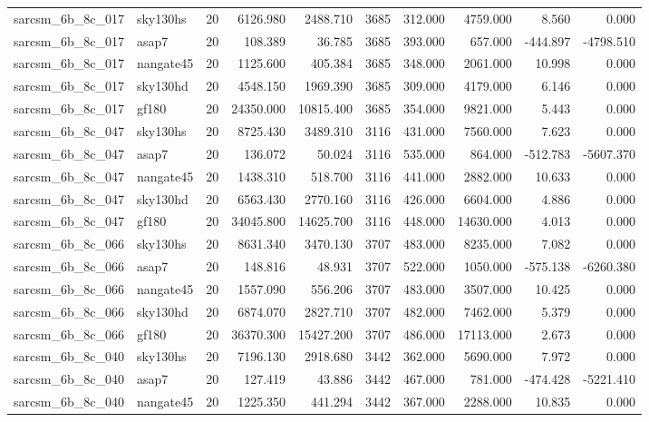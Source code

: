 \documentclass{article}
\begin{document}
\begin{longtable}{llrrrrrrrr}
sarcsm\_6b\_8c\_017 & sky130hs & 20 & 6126.980 & 2488.710 & 3685 & 312.000 & 4759.000 & 8.560 & 0.000 \\
sarcsm\_6b\_8c\_017 & asap7 & 20 & 108.389 & 36.785 & 3685 & 393.000 & 657.000 & -444.897 & -4798.510 \\
sarcsm\_6b\_8c\_017 & nangate45 & 20 & 1125.600 & 405.384 & 3685 & 348.000 & 2061.000 & 10.998 & 0.000 \\
sarcsm\_6b\_8c\_017 & sky130hd & 20 & 4548.150 & 1969.390 & 3685 & 309.000 & 4179.000 & 6.146 & 0.000 \\
sarcsm\_6b\_8c\_017 & gf180 & 20 & 24350.000 & 10815.400 & 3685 & 354.000 & 9821.000 & 5.443 & 0.000 \\
sarcsm\_6b\_8c\_047 & sky130hs & 20 & 8725.430 & 3489.310 & 3116 & 431.000 & 7560.000 & 7.623 & 0.000 \\
sarcsm\_6b\_8c\_047 & asap7 & 20 & 136.072 & 50.024 & 3116 & 535.000 & 864.000 & -512.783 & -5607.370 \\
sarcsm\_6b\_8c\_047 & nangate45 & 20 & 1438.310 & 518.700 & 3116 & 441.000 & 2882.000 & 10.633 & 0.000 \\
sarcsm\_6b\_8c\_047 & sky130hd & 20 & 6563.430 & 2770.160 & 3116 & 426.000 & 6604.000 & 4.886 & 0.000 \\
sarcsm\_6b\_8c\_047 & gf180 & 20 & 34045.800 & 14625.700 & 3116 & 448.000 & 14630.000 & 4.013 & 0.000 \\
sarcsm\_6b\_8c\_066 & sky130hs & 20 & 8631.340 & 3470.130 & 3707 & 483.000 & 8235.000 & 7.082 & 0.000 \\
sarcsm\_6b\_8c\_066 & asap7 & 20 & 148.816 & 48.931 & 3707 & 522.000 & 1050.000 & -575.138 & -6260.380 \\
sarcsm\_6b\_8c\_066 & nangate45 & 20 & 1557.090 & 556.206 & 3707 & 483.000 & 3507.000 & 10.425 & 0.000 \\
sarcsm\_6b\_8c\_066 & sky130hd & 20 & 6874.070 & 2827.710 & 3707 & 482.000 & 7462.000 & 5.379 & 0.000 \\
sarcsm\_6b\_8c\_066 & gf180 & 20 & 36370.300 & 15427.200 & 3707 & 486.000 & 17113.000 & 2.673 & 0.000 \\
sarcsm\_6b\_8c\_040 & sky130hs & 20 & 7196.130 & 2918.680 & 3442 & 362.000 & 5690.000 & 7.972 & 0.000 \\
sarcsm\_6b\_8c\_040 & asap7 & 20 & 127.419 & 43.886 & 3442 & 467.000 & 781.000 & -474.428 & -5221.410 \\
sarcsm\_6b\_8c\_040 & nangate45 & 20 & 1225.350 & 441.294 & 3442 & 367.000 & 2288.000 & 10.835 & 0.000 \\

\end{longtable}
\end{document}
